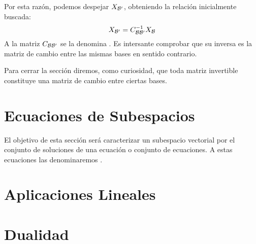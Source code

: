 Por esta razón, podemos despejar $X_{\mathcal{B}'}$, obteniendo la relación inicialmente buscada:
\begin{equation}
	X_{\mathcal{B}'}=C_{\mathcal{B}\mathcal{B}'}^{-1}X_{\mathcal{B}}
\end{equation}
A la matriz $C_{\mathcal{B}\mathcal{B}'}$ se la denomina . Es intersante comprobar que su inversa es la matriz de cambio entre las mismas bases en sentido contrario.

Para cerrar la sección diremos, como curiosidad, que toda matriz invertible constituye una matriz de cambio entre ciertas bases.

\section{Ecuaciones de Subespacios}
El objetivo de esta sección será caracterizar un subespacio vectorial por el conjunto de soluciones de una ecuación o conjunto de ecuaciones. A estas ecuaciones las denominaremos .
\section{Aplicaciones Lineales}
\section{Dualidad}